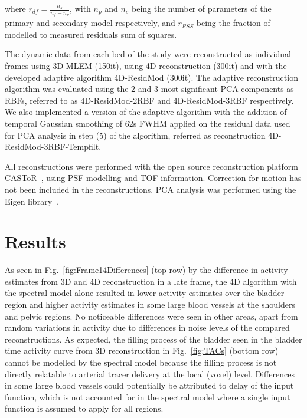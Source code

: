 where $r_{df} = \frac{n_s}{n_f - n_p}$, with $n_p$ and $n_s$ being the number of parameters of the primary and secondary model respectively, and $r_{RSS}$ being the fraction of modelled to measured residuals sum of squares. 


The dynamic data from each bed of the study were reconstructed as individual frames using 3D MLEM (150it), using 4D reconstruction (300it) and with the developed adaptive algorithm 4D-ResidMod (300it). The adaptive reconstruction algorithm was evaluated using the 2 and 3 most significant PCA components as RBFs, referred to as 4D-ResidMod-2RBF and 4D-ResidMod-3RBF respectively. We also implemented a version of the adaptive algorithm with the addition of temporal Gaussian smoothing of 62s FWHM applied on the residual data used for PCA analysis in step (5) of the algorithm, referred as reconstruction 4D-ResidMod-3RBF-Tempfilt.

All reconstructions were performed with the open source reconstruction platform CASToR~\cite{Merlin2018}, using PSF modelling and TOF information. Correction for motion has not been included in the reconstructions. PCA analysis was performed using the Eigen library~\cite{eigenweb}. 

\section{Results}
As seen in Fig.~\ref{fig:Frame14Differences} (top row) by the difference in activity estimates from 3D and 4D reconstruction in a late frame, the 4D algorithm with the spectral model alone resulted in lower activity estimates over the bladder region and higher activity estimates in some large blood vessels at the shoulders and pelvic regions. No noticeable differences were seen in other areas, apart from random variations in activity due to differences in noise levels of the compared reconstructions.
As expected, the filling process of the bladder seen in the bladder time activity curve from 3D reconstruction in Fig.~\ref{fig:TACs} (bottom row) cannot be modelled by the spectral model because the filling process is not directly relatable to arterial tracer delivery at the local (voxel) level. Differences in some large blood vessels could potentially be attributed to delay of the input function, which is not accounted for in the spectral model where a single input function is assumed to apply for all regions. 

